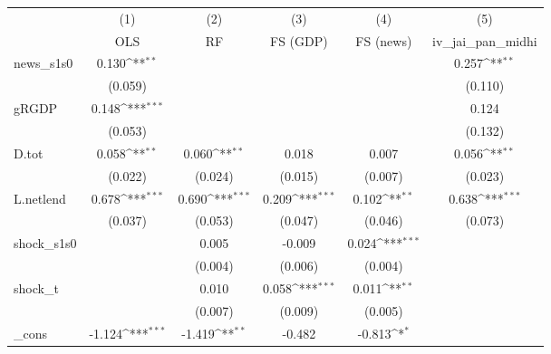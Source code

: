 {
\def\sym#1{\ifmmode^{#1}\else\(^{#1}\)\fi}
\begin{tabular}{l*{5}{c}}
\toprule
            &\multicolumn{1}{c}{(1)}&\multicolumn{1}{c}{(2)}&\multicolumn{1}{c}{(3)}&\multicolumn{1}{c}{(4)}&\multicolumn{1}{c}{(5)}\\
            &\multicolumn{1}{c}{OLS}&\multicolumn{1}{c}{RF}&\multicolumn{1}{c}{FS (GDP)}&\multicolumn{1}{c}{FS (news)}&\multicolumn{1}{c}{iv\_jai\_pan\_midhi}\\
\midrule
news\_s1s0   &       0.130\sym{**} &                     &                     &                     &       0.257\sym{**} \\
            &     (0.059)         &                     &                     &                     &     (0.110)         \\
\addlinespace
gRGDP       &       0.148\sym{***}&                     &                     &                     &       0.124         \\
            &     (0.053)         &                     &                     &                     &     (0.132)         \\
\addlinespace
D.tot       &       0.058\sym{**} &       0.060\sym{**} &       0.018         &       0.007         &       0.056\sym{**} \\
            &     (0.022)         &     (0.024)         &     (0.015)         &     (0.007)         &     (0.023)         \\
\addlinespace
L.netlend   &       0.678\sym{***}&       0.690\sym{***}&       0.209\sym{***}&       0.102\sym{**} &       0.638\sym{***}\\
            &     (0.037)         &     (0.053)         &     (0.047)         &     (0.046)         &     (0.073)         \\
\addlinespace
shock\_s1s0  &                     &       0.005         &      -0.009         &       0.024\sym{***}&                     \\
            &                     &     (0.004)         &     (0.006)         &     (0.004)         &                     \\
\addlinespace
shock\_t     &                     &       0.010         &       0.058\sym{***}&       0.011\sym{**} &                     \\
            &                     &     (0.007)         &     (0.009)         &     (0.005)         &                     \\
\addlinespace
\_cons      &      -1.124\sym{***}&      -1.419\sym{**} &      -0.482         &      -0.813\sym{*}  &                     \\

\end{tabular}}
